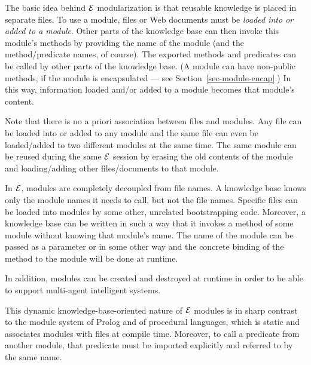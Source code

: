 \documentclass[11pt]{article}
\newcommand{\ERGO}{\mbox{\ensuremath{\cal{E}}\smaller{{\sc{RGO}}}}\xspace}
\newcommand{\FLSYSTEM}{\ERGO}
\begin{document}
The basic idea behind \FLSYSTEM modularization is that reusable knowledge
is placed in separate files.  To use a module, files or Web documents must be
\emph{loaded into or added to a module}. Other parts of the knowledge base can then invoke
this module's methods by providing the name of the module (and the
method/predicate names, of course).  
The exported methods and predicates can be called by other
parts of the knowledge base. (A module can have non-public methods, if the module
is encapsulated ---
see Section~\ref{sec-module-encap}.)
In this way, information loaded and/or added
to a module becomes that module's content.

Note that there is no a priori association between files and modules.  Any
file can be loaded into or added to
any module and the same file can even be loaded/added
to two different modules at the same time. The same module can be reused
during the same \FLSYSTEM session by erasing the old contents of the module
and loading/adding other files/documents
to that module.

In \FLSYSTEM, modules are completely decoupled from file names. A
knowledge base knows only the module names it needs to call, but not the file
names. Specific files can be loaded into modules by some other, unrelated
bootstrapping code. Moreover, a knowledge base can be written in such a way
that it invokes a method of some module without knowing that module's name.
The name of the module can be passed as a parameter or in some other way
and the concrete binding of the method to the module will be done at
runtime.

In addition, modules can be created and destroyed at runtime in order to be
able to support multi-agent intelligent systems.

This dynamic knowledge-base-oriented
nature of \FLSYSTEM modules
is in sharp contrast to the module
system of Prolog and of procedural languages, which is static and associates modules with files at compile
time. Moreover, to call a predicate from another module, that predicate
must be imported explicitly and referred to by the same name.
\end{document}
